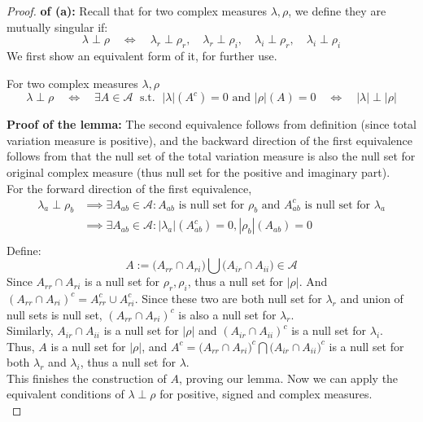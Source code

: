 \documentclass[lang=cn,11pt]{elegantbook}
\begin{document}
\begin{proof}
   \textbf{ of (a):}
   Recall that for two complex measures $\lambda,\rho$, we define they are mutually singular if: $$
\lambda \perp \rho \quad \Longleftrightarrow \quad \lambda_r \perp \rho_r, \quad \lambda_r \perp \rho_i, \quad \lambda_i \perp \rho_r, \quad \lambda_i \perp \rho_i
$$
We first show an equivalent form of it, for further use.\\
\begin{lemma}
    For two complex measures $\lambda,\rho$ \[
    \lambda \perp \rho \quad \iff \quad \exists A
    \in  \mathcal{A}\; \text{ s.t. } \; |\lambda|(A^c)=0\text{ and }|\rho|(A)=0  \quad \iff \quad |\lambda| \perp |\rho|
    \]
\end{lemma}
\noindent \textbf{Proof of the lemma:} The second equivalence follows from definition (since total variation measure is positive), and the backward direction of the first equivalence follows from that the null set of the total variation measure is also the null set for original complex measure (thus null set for the positive and imaginary part).\\
For the forward direction of the first equivalence, $$
\begin{aligned}
 \lambda_a \perp \rho_b &\implies     \exists A_{ab} \in \mathcal{A}:A_{ab} \text{ is null set for }   \rho_b \text{ and } A^c_{ab} \text{ is null set for } \lambda_a \\
&\implies \exists A_{ab} \in \mathcal{A}: |\lambda_a | \left(A^c_{ab}\right)=0, |\rho_b| \left(A_{ab}\right)=0 \\
\end{aligned}
$$
Define: $$
A:=\bigg(A_{r r} \cap A_{r i}\bigg)  \bigcup \bigg( A_{i r} \cap A_{i i}\bigg) \in \mathcal{A}
$$
Since $A_{r r} \cap A_{r i}$ is a null set for $\rho_r,\rho_i$, thus a null set for $|\rho|$. And $(A_{r r} \cap A_{r i})^c = A_{r r}^c \cup A_{r i}^c$. Since these two are both null set for $\lambda_r$ and union of null sets is null set, $(A_{r r} \cap A_{r i})^c$ is also a null set for $\lambda_r$.\\
Similarly, $ A_{i r} \cap A_{i i}$ is a null set for $|\rho|$ and $ (A_{i r} \cap A_{i i})^c$ is a null set for $\lambda_i$.\\
Thus, $A$ is a null set for $|\rho|$, and $A^c  = \big(A_{r r} \cap A_{r i}\big)^c  \bigcap \big( A_{i r} \cap A_{i i}\big)^c $ is a null set for both $\lambda_r$
 and $\lambda_i$, thus a null set for $\lambda$.\\
 This finishes the construction of $A$, proving our lemma. Now we can apply the equivalent conditions of $\lambda \perp \rho$ for positive, signed and complex measures.\\

\end{proof}
\end{document}
